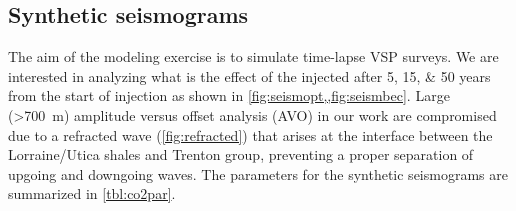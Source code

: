 \subsection{Synthetic seismograms}
The aim of the modeling exercise is to simulate time-lapse VSP surveys. We are
interested in analyzing what is the effect of the injected  after
\numlist{5;15;50} years from the start of injection as shown in
\cref{fig:seismopt,,fig:seismbec}. Large (\SI{>700}{\metre}) amplitude versus
offset analysis (AVO) \citep{Backus1982,Ostrander1982,Ostrander1984} in our work
are compromised due to a refracted wave (\cref{fig:refracted}) that arises at
the interface between the Lorraine/Utica shales and Trenton group, preventing a
proper separation of upgoing and downgoing waves. The parameters for the
synthetic seismograms are summarized in \cref{tbl:co2par}.

